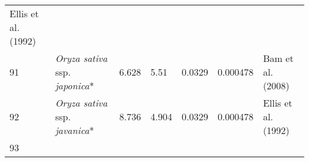 \documentclass[]{article}
\begin{document}
\begin{longtable}[]{@{}lllllll@{}}
\begin{minipage}[t]{0.23\columnwidth}
Ellis et al. (1992)\strut
\end{minipage}\tabularnewline
\begin{minipage}[t]{0.05\columnwidth}\raggedright
91\strut
\end{minipage} & \begin{minipage}[t]{0.23\columnwidth}\raggedright
\emph{Oryza sativa} ssp. \emph{japonica}*\strut
\end{minipage} & \begin{minipage}[t]{0.05\columnwidth}\raggedright
6.628\strut
\end{minipage} & \begin{minipage}[t]{0.08\columnwidth}\raggedright
5.51\strut
\end{minipage} & \begin{minipage}[t]{0.08\columnwidth}\raggedright
0.0329\strut
\end{minipage} & \begin{minipage}[t]{0.08\columnwidth}\raggedright
0.000478\strut
\end{minipage} & \begin{minipage}[t]{0.23\columnwidth}\raggedright
Bam et al. (2008)\strut
\end{minipage}\tabularnewline
\begin{minipage}[t]{0.05\columnwidth}\raggedright
92\strut
\end{minipage} & \begin{minipage}[t]{0.23\columnwidth}\raggedright
\emph{Oryza sativa} ssp. \emph{javanica}*\strut
\end{minipage} & \begin{minipage}[t]{0.05\columnwidth}\raggedright
8.736\strut
\end{minipage} & \begin{minipage}[t]{0.08\columnwidth}\raggedright
4.904\strut
\end{minipage} & \begin{minipage}[t]{0.08\columnwidth}\raggedright
0.0329\strut
\end{minipage} & \begin{minipage}[t]{0.08\columnwidth}\raggedright
0.000478\strut
\end{minipage} & \begin{minipage}[t]{0.23\columnwidth}\raggedright
Ellis et al. (1992)\strut
\end{minipage}\tabularnewline
\begin{minipage}[t]{0.05\columnwidth}\raggedright
93\strut
\end{minipage} & \begin{minipage}[t]{0.23\columnwidth}\raggedright

\end{minipage}
\end{longtable}
\end{document}
